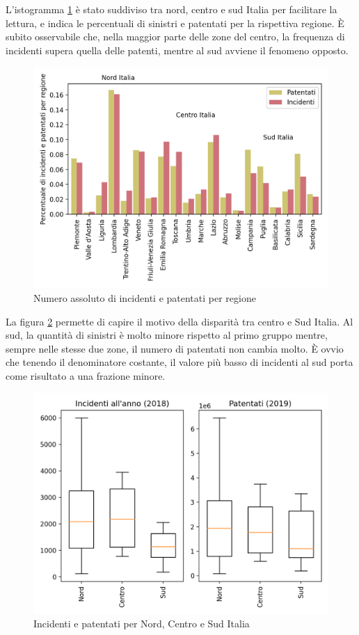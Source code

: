 \documentclass[a4paper]{report}
\begin{document}
L'istogramma \ref{fig:incidenti-patentati-bar} è stato suddiviso tra nord, 
centro e sud Italia per facilitare la lettura, e indica le percentuali di sinistri e 
patentati per la rispettiva regione. 
\`E subito osservabile che, nella maggior parte delle zone del centro, 
la frequenza di incidenti supera quella delle patenti, 
mentre al sud avviene il fenomeno opposto. 

\begin{figure}
    \hfill\includegraphics[width=0.7\linewidth]{../src/incidenti/incidenti_aci/mappe_regioni/incidenti_patenti_bar.png}\hspace*{\fill}
    \caption{Numero assoluto di incidenti e patentati per regione}
    \label{fig:incidenti-patentati-bar}
\end{figure}

La figura \ref{fig:incidenti-patentati-box} permette di capire il motivo della disparità 
tra centro e Sud Italia. 
Al sud, la quantità di sinistri è molto minore rispetto al primo gruppo mentre, 
sempre nelle stesse due zone, il numero di patentati non cambia molto. 
\`E ovvio che tenendo il denominatore costante, il valore più basso di incidenti al 
sud porta come risultato a una frazione minore. 

\begin{figure}
    \hfill\includegraphics[width=0.7\linewidth]{../src/incidenti/incidenti_aci/mappe_regioni/incidenti_patenti_box.png}\hspace*{\fill}
    \caption{Incidenti e patentati per Nord, Centro e Sud Italia}
    \label{fig:incidenti-patentati-box}
\end{figure}
\end{document}

